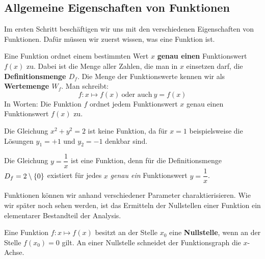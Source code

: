 \documentclass[ngerman, 12pt]{nssheetxea}
\begin{document}
\subsection{Allgemeine Eigenschaften von Funktionen} \label{sub:Allgemeine Eigenschaften von Funktionen}
Im ersten Schritt beschäftigen wir uns mit den verschiedenen Eigenschaften von Funktionen. Dafür müssen wir zuerst wissen, was eine Funktion ist.

\begin{definition}
Eine Funktion ordnet einem bestimmten Wert $x$ \textbf{genau einen} Funktionswert $f(x)$ zu. Dabei ist die Menge aller Zahlen, die man in $x$ einsetzen darf, die \textbf{Definitionsmenge $D_f$}. Die Menge der Funktionswerte kennen wir als \textbf{Wertemenge $W_f$}. Man schreibt:
\[ f:x \mapsto f(x) \ \text{oder auch} \ y=f(x) \]
In Worten: \glqq Die Funktion $f$ ordnet jedem Funktionswert $x$ genau einen Funktionswert $f(x)$ zu.\grqq
\label{Def:Funktion}
\end{definition}

\begin{example}
Die Gleichung $x^2+y^2=2$ ist keine Funktion, da für $x=1$ beispielsweise die Lösungen $y_1=+1$ und $y_2=-1$ denkbar sind. \par
Die Gleichung $y=\dfrac{1}{x}$ ist eine Funktion, denn für die Definitionsmenge $D_f=2 \setminus \{0\}$ existiert für jedes $x$ \textit{genau ein} Funktionswert $y=\dfrac{1}{x}$.
\end{example}

Funktionen können wir anhand verschiedener Parameter charaktierisieren. Wie wir später noch sehen werden, ist das Ermitteln der Nullstellen einer Funktion ein elementarer Bestandteil der Analysis.

\begin{definition}
Eine Funktion $f:x\mapsto f(x)$ besitzt an der Stelle $x_0$ eine \textbf{Nullstelle}, wenn an der Stelle $f(x_0)=0$ gilt. An einer Nullstelle schneidet der Funktionsgraph die $x$-Achse.
\end{definition}
\end{document}
